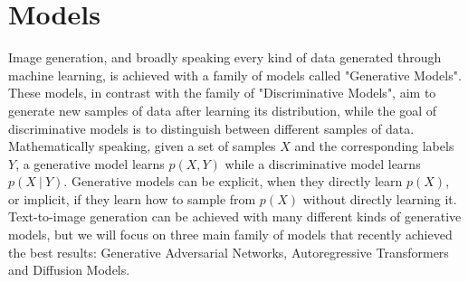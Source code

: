 \documentclass[conference]{IEEEtran}
\begin{document}
\section{Models}
Image generation, and broadly speaking every kind of data generated through machine learning, is achieved with a family of models called "Generative Models". These models, in contrast with the family of "Discriminative Models", aim to generate new samples of data after learning its distribution, while the goal of discriminative models is to distinguish between different samples of data. Mathematically speaking, given a set of samples $X$ and the corresponding labels $Y$, a generative model learns $p(X, Y)$ while a discriminative model learns $p(X\:|\:Y)$. Generative models can be explicit, when they directly learn $p(X)$, or implicit, if they learn how to sample from $p(X)$ without directly learning it.\\
Text-to-image generation can be achieved with many different kinds of generative models, but we will focus on three main family of models that recently achieved the best results: Generative Adversarial Networks, Autoregressive Transformers and Diffusion Models.
\end{document}
